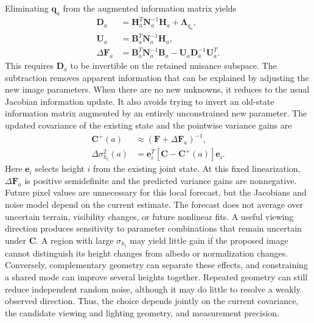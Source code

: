 Eliminating $\mathbf q_a$ from the augmented information matrix yields
\begin{equation}
    \begin{aligned}
        \mathbf D_a&=\mathbf H_a^T\mathbf N_a^{-1}\mathbf H_a
                       +\boldsymbol\Lambda_{q_a},\\
        \mathbf U_a&=\mathbf B_a^T\mathbf N_a^{-1}\mathbf H_a,\\
        \Delta\mathbf F_a&=\mathbf B_a^T\mathbf N_a^{-1}\mathbf B_a
                       -\mathbf U_a\mathbf D_a^{-1}\mathbf U_a^T.
    \end{aligned}
    \label{eq:uncertainty-effective-information}
\end{equation}
This requires $\mathbf D_a$ to be invertible on the retained nuisance subspace. The subtraction removes apparent information that can be explained by adjusting the new image parameters. When there are no new unknowns, it reduces to the usual Jacobian information update. It also avoids trying to invert an old-state information matrix augmented by an entirely unconstrained new parameter.
The updated covariance of the existing state and the pointwise variance gains are
\begin{equation}
    \begin{aligned}
        \mathbf C^+(a)&\approx
        (\mathbf F+\Delta\mathbf F_a)^{-1},\\
        \Delta\sigma_{h_i}^2(a)&=
        \mathbf e_i^T[\mathbf C-\mathbf C^+(a)]\mathbf e_i .
    \end{aligned}
    \label{eq:uncertainty-observation-gain}
\end{equation}
Here $\mathbf e_i$ selects height $i$ from the existing joint state. At this fixed linearization, $\Delta\mathbf F_a$ is positive semidefinite and the predicted variance gains are nonnegative. Future pixel values are unnecessary for this local forecast, but the Jacobians and noise model depend on the current estimate. The forecast does not average over uncertain terrain, visibility changes, or future nonlinear fits.
A useful viewing direction produces sensitivity to parameter combinations that remain uncertain under $\mathbf C$. A region with large $\sigma_{h_i}$ may yield little gain if the proposed image cannot distinguish its height changes from albedo or normalization changes. Conversely, complementary geometry can separate these effects, and constraining a shared mode can improve several heights together. Repeated geometry can still reduce independent random noise, although it may do little to resolve a weakly observed direction. Thus, the choice depends jointly on the current covariance, the candidate viewing and lighting geometry, and measurement precision.
